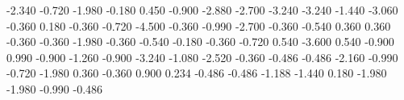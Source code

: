          {-2.340}
         {-0.720}
         {-1.980}
         {-0.180}
          {0.450}
         {-0.900}
         {-2.880}
         {-2.700}
         {-3.240}
         {-3.240}
         {-1.440}
         {-3.060}
         {-0.360}
          {0.180}
         {-0.360}
         {-0.720}
         {-4.500}
         {-0.360}
         {-0.990}
         {-2.700}
         {-0.360}
         {-0.540}
          {0.360}
          {0.360}
         {-0.360}
         {-0.360}
         {-1.980}
         {-0.360}
         {-0.540}
         {-0.180}
         {-0.360}
      {-0.720}
        {0.540}
     {-3.600}
      {0.540}
     {-0.900}
     {0.990}
        {-0.900}
        {-1.260}
     {-0.900}
   {-3.240}
       {-1.080}
       {-2.520}
     {-0.360}
      {-0.486}
   {-0.486}
     {-2.160}
      {-0.990}
     {-0.720}
  {-1.980}
       {0.360}
     {-0.360}
     {0.900}
         {0.234}
        {-0.486}
        {-0.486}
        {-1.188}
     {-1.440}
     {0.180}
     {-1.980}
  {-1.980}
       {-0.990}
   {-0.486}
